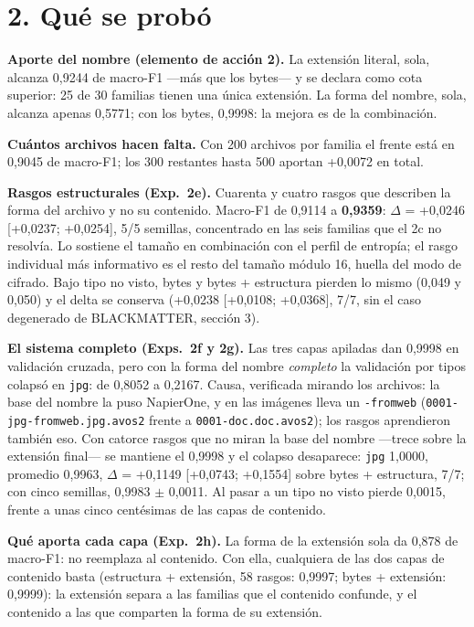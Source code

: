 \documentclass[11pt,a4paper]{article}
\begin{document}
\section*{2. Qué se probó}

\textbf{Aporte del nombre (elemento de acción 2).} La extensión literal, sola, alcanza 0,9244 de
macro-F1 ---más que los bytes--- y se declara como cota superior: 25 de 30 familias tienen una
única extensión. La forma del nombre, sola, alcanza apenas 0,5771; con los bytes, 0,9998: la
mejora es de la combinación.

\textbf{Cuántos archivos hacen falta.} Con 200 archivos por familia el frente está en 0,9045 de
macro-F1; los 300 restantes hasta 500 aportan +0,0072 en total.

\textbf{Rasgos estructurales (Exp.\ 2e).} Cuarenta y cuatro rasgos que describen la forma del
archivo y no su contenido. Macro-F1 de 0,9114 a \textbf{0,9359}: $\Delta$ = +0,0246 [+0,0237;
+0,0254], 5/5 semillas, concentrado en las seis familias que el 2c no resolvía. Lo sostiene el
tamaño en combinación con el perfil de entropía; el rasgo individual más informativo es el resto
del tamaño módulo 16, huella del modo de cifrado. Bajo tipo no visto, bytes y bytes + estructura
pierden lo mismo (0,049 y 0,050) y el delta se conserva (+0,0238 [+0,0108; +0,0368], 7/7, sin el caso degenerado de BLACKMATTER, sección 3).

\textbf{El sistema completo (Exps.\ 2f y 2g).} Las tres capas apiladas dan 0,9998 en validación
cruzada, pero con la forma del nombre \emph{completo} la validación por tipos colapsó en
\texttt{jpg}: de 0,8052 a 0,2167. Causa, verificada mirando los archivos: la base del nombre la
puso NapierOne, y en las imágenes lleva un \texttt{-fromweb} (\texttt{0001-jpg-fromweb.jpg.avos2}
frente a \texttt{0001-doc.doc.avos2}); los rasgos aprendieron también eso. Con catorce rasgos que
no miran la base del nombre ---trece sobre la extensión final--- se mantiene el 0,9998 y el colapso desaparece: \texttt{jpg} 1,0000,
promedio 0,9963, $\Delta$ = +0,1149 [+0,0743; +0,1554] sobre bytes + estructura, 7/7; con cinco semillas, 0,9983 $\pm$ 0,0011.
Al pasar a un tipo no visto pierde 0,0015, frente a unas cinco centésimas de las capas de contenido.

\textbf{Qué aporta cada capa (Exp.\ 2h).} La forma de la extensión sola da 0,878 de macro-F1: no
reemplaza al contenido. Con ella, cualquiera de las dos capas de contenido basta (estructura +
extensión, 58 rasgos: 0,9997; bytes + extensión: 0,9999): la extensión separa a las familias que
el contenido confunde, y el contenido a las que comparten la forma de su extensión.
\end{document}
